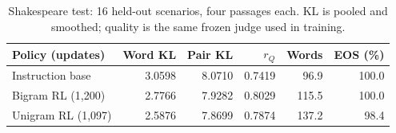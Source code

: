 \begin{table}[htbp]
\centering\small
\caption{Shakespeare test: 16 held-out scenarios, four passages each. KL is pooled and smoothed; quality is the same frozen judge used in training.}\label{tab:passage-new}
\begin{tabular}{@{}lrrrrr@{}}
\toprule
Policy (updates) & Word KL & Pair KL & $r_Q$ & Words & EOS (\%)\\
\midrule
Instruction base & 3.0598 & 8.0710 & 0.7419 & 96.9 & 100.0\\
Bigram RL (1,200) & 2.7766 & 7.9282 & 0.8029 & 115.5 & 100.0\\
Unigram RL (1,097) & 2.5876 & 7.8699 & 0.7874 & 137.2 & 98.4\\
\bottomrule
\end{tabular}
\end{table}
